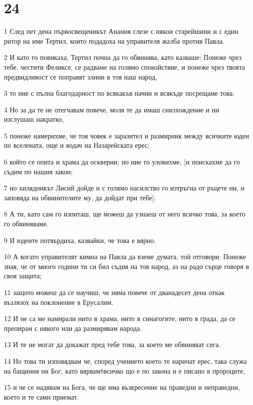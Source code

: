 \chapter{24}

\par 1 След пет дена първосвещеникът Анания слезе с някои старейшини и с един ритор на име Тертил, които подадоха на управителя жалба против Павла.
\par 2 И като го повикаха, Тертил почна да го обвинява, като казваше: Понеже чрез тебе, честити Феликсе, се радваме на голямо спокойствие, и понеже чрез твоята предвидливост се поправят злини в тоя наш народ,
\par 3 то ние с пълна благодарност по всякакъв начин и всякъде посрещаме това.
\par 4 Но за да те не отегчавам повече, моля те да имаш снизхождение и ни изслушаш накратко,
\par 5 понеже намерихме, че тоя човек е заразител и размирник между всичките юдеи по вселената, още и водач на Назарейската ерес;
\par 6 който се опита и храма да оскверни; но ние го уловихме, [и поискахме да го съдим по нашия закон;
\par 7 но хилядникът Лисий дойде и с голямо насилство го изтръгна от ръцете ни, и заповяда на обвинителите му, да дойдат при тебе].
\par 8 А ти, като сам го изпиташ, ще можеш да узнаеш от него всичко това, за което го обвиняваме.
\par 9 И юдеите потвърдиха, казвайки, че това е вярно.
\par 10 А когато управителят кимна на Павла да вземе думата, той отговори: Понеже зная, че от много години ти си бил съдия на тоя народ, аз на радо сърце говоря в своя защита;
\par 11 защото можеш да се научиш, че няма повече от дванадесет дена откак възлязох на поклонение в Ерусалим.
\par 12 И не са ме намирали нито в храма, нито в синагогите, нито в града, да се препирам с някого или да размирявам народа.
\par 13 И те не могат да докажат пред тебе това, за което ме обвиняват сега.
\par 14 Но това ти изповядвам че, според учението което те наричат ерес, така служа на бащиния ни Бог, като вярвам8всичко що е по закона и е писано в пророците,
\par 15 и че се надявам на Бога, че ще има възкресение на праведни и неправедни, което и те сами приемат.
